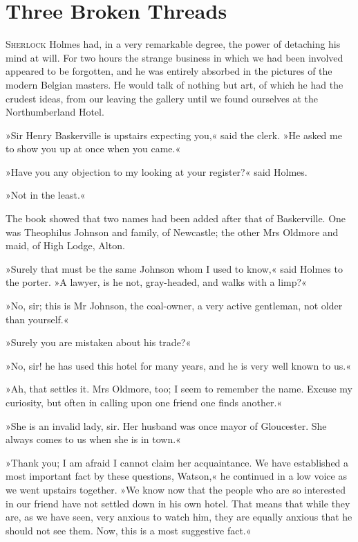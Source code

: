 \chapter{Three Broken Threads}
\lettrine[lines=1]{S}{herlock} Holmes had, in a very remarkable degree, the power of detaching his mind at will. For two hours the strange business in which we had been involved appeared to be forgotten, and he was entirely absorbed in the pictures of the modern Belgian masters. He would talk of nothing but art, of which he had the crudest ideas, from our leaving the gallery until we found ourselves at the Northumberland Hotel.

»Sir Henry Baskerville is upstairs expecting you,« said the clerk. »He asked me to show you up at once when you came.«

»Have you any objection to my looking at your register?« said Holmes.

»Not in the least.«

The book showed that two names had been added after that of Baskerville. One was Theophilus Johnson and family, of Newcastle; the other Mrs Oldmore and maid, of High Lodge, Alton.

»Surely that must be the same Johnson whom I used to know,« said Holmes to the porter. »A lawyer, is he not, gray-headed, and walks with a limp?«

»No, sir; this is Mr Johnson, the coal-owner, a very active gentleman, not older than yourself.«

»Surely you are mistaken about his trade?«

»No, sir! he has used this hotel for many years, and he is very well known to us.«

»Ah, that settles it. Mrs Oldmore, too; I seem to remember the name. Excuse my curiosity, but often in calling upon one friend one finds another.«

»She is an invalid lady, sir. Her husband was once mayor of Gloucester. She always comes to us when she is in town.«

»Thank you; I am afraid I cannot claim her acquaintance. We have established a most important fact by these questions, Watson,« he continued in a low voice as we went upstairs together. »We know now that the people who are so interested in our friend have not settled down in his own hotel. That means that while they are, as we have seen, very anxious to watch him, they are equally anxious that he should not see them. Now, this is a most suggestive fact.«

